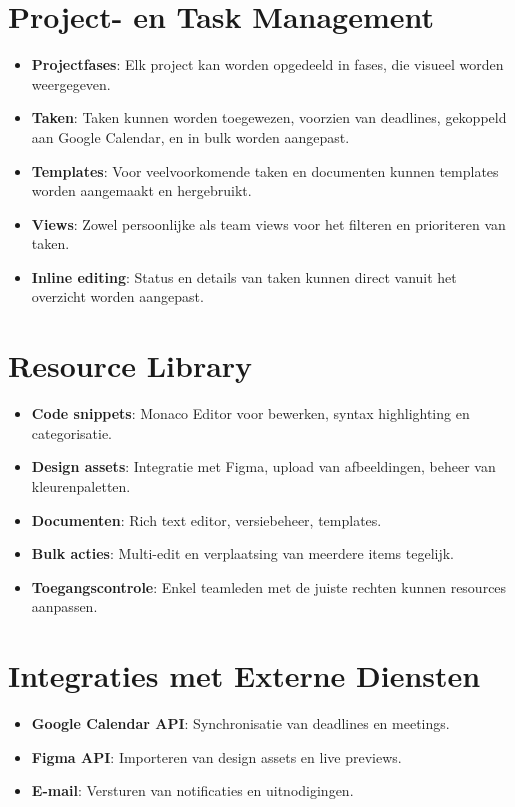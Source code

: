 \section{Project- en Task Management}
\label{sec:project-task}

\begin{itemize}
    \item \textbf{Projectfases}: Elk project kan worden opgedeeld in fases, die visueel worden weergegeven.
    \item \textbf{Taken}: Taken kunnen worden toegewezen, voorzien van deadlines, gekoppeld aan Google Calendar, en in bulk worden aangepast.
    \item \textbf{Templates}: Voor veelvoorkomende taken en documenten kunnen templates worden aangemaakt en hergebruikt.
    \item \textbf{Views}: Zowel persoonlijke als team views voor het filteren en prioriteren van taken.
    \item \textbf{Inline editing}: Status en details van taken kunnen direct vanuit het overzicht worden aangepast.
\end{itemize}

\section{Resource Library}
\label{sec:resource-library}

\begin{itemize}
    \item \textbf{Code snippets}: Monaco Editor voor bewerken, syntax highlighting en categorisatie.
    \item \textbf{Design assets}: Integratie met Figma, upload van afbeeldingen, beheer van kleurenpaletten.
    \item \textbf{Documenten}: Rich text editor, versiebeheer, templates.
    \item \textbf{Bulk acties}: Multi-edit en verplaatsing van meerdere items tegelijk.
    \item \textbf{Toegangscontrole}: Enkel teamleden met de juiste rechten kunnen resources aanpassen.
\end{itemize}

\section{Integraties met Externe Diensten}
\label{sec:integraties}

\begin{itemize}
    \item \textbf{Google Calendar API}: Synchronisatie van deadlines en meetings.
    \item \textbf{Figma API}: Importeren van design assets en live previews.
    \item \textbf{E-mail}: Versturen van notificaties en uitnodigingen.
   
\end{itemize}


